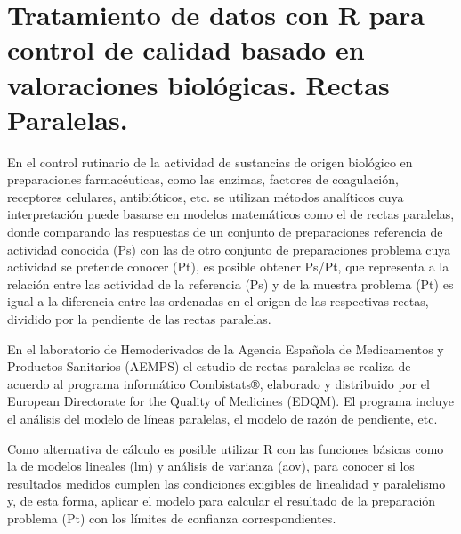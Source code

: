 \chapter{Tratamiento de datos con R para control de calidad basado en valoraciones biológicas. Rectas Paralelas.}




En el control rutinario de la actividad de sustancias de origen biológico en preparaciones farmacéuticas, como las enzimas, factores de coagulación, receptores celulares, antibióticos, etc. se utilizan métodos analíticos cuya interpretación puede basarse en modelos matemáticos como el de rectas paralelas, donde comparando las respuestas de un conjunto de preparaciones referencia de actividad conocida (Ps) con las de otro conjunto de preparaciones problema cuya actividad se pretende conocer (Pt), es posible obtener Ps/Pt, que representa a la relación entre las actividad de la referencia (Ps) y de la muestra problema (Pt) es igual a la diferencia entre las ordenadas en el origen de las respectivas rectas, dividido por la pendiente de las rectas paralelas.

En el laboratorio de Hemoderivados de la Agencia Española de Medicamentos y Productos Sanitarios (AEMPS) el estudio de rectas paralelas se realiza de acuerdo al programa informático Combistats®, elaborado y distribuido por el European Directorate for the Quality of Medicines (EDQM). El programa incluye el análisis del modelo de líneas paralelas, el modelo de razón de pendiente, etc.

Como alternativa de cálculo es posible utilizar R con las funciones básicas como la de modelos lineales (lm) y análisis de varianza (aov), para conocer si los resultados medidos cumplen las condiciones exigibles de linealidad y paralelismo y, de esta forma, aplicar el modelo para calcular el resultado de la preparación problema (Pt) con los límites de confianza correspondientes.

